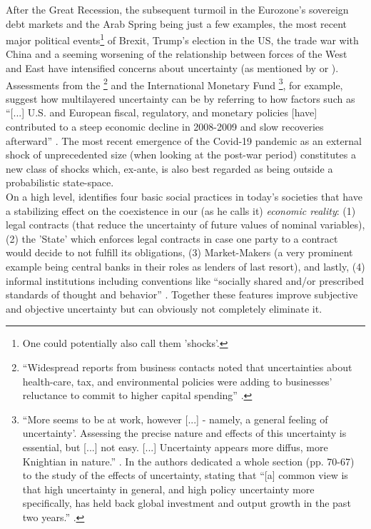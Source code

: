 \documentclass[a4paper,11pt,listof=nochaptergap,oneside,pointednumbers,bibtotoc,bigheadings,liststotoc,hidelinks]{scrbook}
\theoremstyle{mysatz}
\theoremstyle{mydefinition}
\theoremstyle{mytheorem}
\theoremstyle{mybemerkung}
\begin{document}
After the Great Recession, the subsequent turmoil in the Eurozone's sovereign debt markets and the Arab Spring being just a few examples, the most recent major political events\footnote{One could potentially also call them 'shocks'.} of Brexit, Trump's election in the US,  the trade war with China and a seeming worsening of the relationship between forces of the West and East have intensified concerns about uncertainty (as mentioned by \citet{bakeretal:15} or \citet{bakerbloomdavis:19}). Assessments from the 
\citet{FOMC:09}\footnote{``Widespread reports from business contacts noted that uncertainties about health-care, tax, and environmental policies were adding to businesses' reluctance to commit to higher capital spending'' \citep{FOMC:09}.} and the International Monetary Fund \citep{IMF:12, IMF:13}\footnote{``More seems to be at work, however [...] - namely, a general feeling of uncertainty'. Assessing the precise nature and effects of this uncertainty is essential, but [...] not easy. [...] Uncertainty appears more diffus, more Knightian in nature.'' \citep{IMF:12}. In \citet{IMF:13} the authors dedicated a whole section (pp. 70-67) to the study of the effects of uncertainty, stating that ``[a] common view is that high uncertainty in general, and high policy uncertainty more specifically, has held back global investment and output growth in the past two years.'' \citep[p. 70]{IMF:13}.}, for example, suggest how multilayered uncertainty can be by referring to how factors such as ``[...] U.S. and European fiscal, regulatory, and monetary policies [have] contributed to a steep economic decline in 2008-2009 and slow recoveries afterward'' \citep[p.1594]{bakeretal:15}. The most recent emergence of the Covid-19 pandemic as an external shock of unprecedented size (when looking at the post-war period) constitutes a new class of shocks which, ex-ante, is also best regarded as being outside a probabilistic state-space. \\

On a high level, \citet{dequesh:00} identifies four basic social practices in today's societies that have a stabilizing effect on the coexistence in our (as  he calls it) \textit{economic reality}: (1) legal contracts (that reduce the uncertainty of future values of nominal variables), (2) the 'State' which enforces legal contracts in case one party to a contract would decide to not fulfill its obligations, (3) Market-Makers (a very prominent example being central banks in their roles as lenders of last resort), and lastly, (4) informal institutions including conventions like ``socially shared and/or prescribed standards of thought and behavior'' \citep[p. 54]{dequesh:00}.  Together these features improve subjective and objective uncertainty but can obviously not completely eliminate it.
\end{document}

